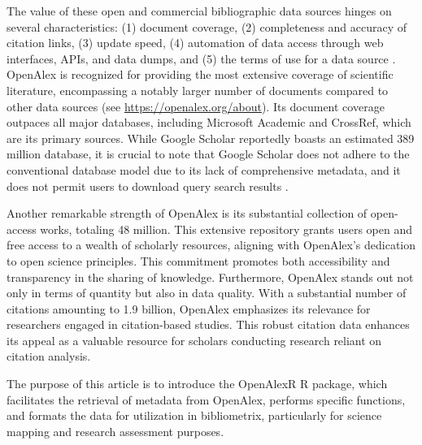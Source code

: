 The value of these open and commercial bibliographic data sources hinges on several characteristics: (1) document coverage, (2) completeness and accuracy of citation links, (3) update speed, (4) automation of data access through web interfaces, APIs, and data dumps, and (5) the terms of use for a data source \citep{wanyama2022you, kulkanjanapiban2022comparative, singh2021journal, martin2021google, visser2021large, waltman2020special, winter2017rentrez}. OpenAlex is recognized for providing the most extensive coverage of scientific literature, encompassing a notably larger number of documents compared to other data sources (see \href{https://openalex.org/about}{https://openalex.org/about}). Its document coverage outpaces all major databases, including Microsoft Academic \citep{visser2021large, wang2020microsoft} and CrossRef, which are its primary sources. While Google Scholar reportedly boasts an estimated 389 million database, it is crucial to note that Google Scholar does not adhere to the conventional database model due to its lack of comprehensive metadata, and it does not permit users to download query search results \citep{dallas2018variable}. 

Another remarkable strength of OpenAlex is its substantial collection of open-access works, totaling 48 million. This extensive repository grants users open and free access to a wealth of scholarly resources, aligning with OpenAlex's dedication to open science principles. This commitment promotes both accessibility and transparency in the sharing of knowledge. Furthermore, OpenAlex stands out not only in terms of quantity but also in data quality. With a substantial number of citations amounting to 1.9 billion, OpenAlex emphasizes its relevance for researchers engaged in citation-based studies. This robust citation data enhances its appeal as a valuable resource for scholars conducting research reliant on citation analysis.

The purpose of this article is to introduce the OpenAlexR R package, which facilitates the retrieval of metadata from OpenAlex, performs specific functions, and formats the data for utilization in bibliometrix, particularly for science mapping and research assessment purposes.




